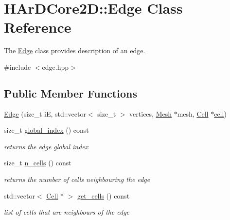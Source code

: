 \hypertarget{classHArDCore2D_1_1Edge}{}\section{H\+Ar\+D\+Core2D\+:\+:Edge Class Reference}
\label{classHArDCore2D_1_1Edge}


The \hyperlink{classHArDCore2D_1_1Edge}{Edge} class provides description of an edge.  




{\ttfamily \#include $<$edge.\+hpp$>$}

\subsection*{Public Member Functions}
\begin{DoxyCompactItemize}
\item 
\hyperlink{classHArDCore2D_1_1Edge_a1bca27244cfcd45e24e0b7485f148ddf}{Edge} (size\+\_\+t iE, std\+::vector$<$ size\+\_\+t $>$ vertices, \hyperlink{classHArDCore2D_1_1Mesh}{Mesh} $\ast$mesh, \hyperlink{classHArDCore2D_1_1Cell}{Cell} $\ast$\hyperlink{classHArDCore2D_1_1Edge_ad4be0bfb981ccf2c1e02e870772dbdc3}{cell})
\item 
size\+\_\+t \hyperlink{group__Mesh_ga774e975ebad5e6bdccf549215293d624}{global\+\_\+index} () const
\begin{DoxyCompactList}\small\item\em returns the edge global index \end{DoxyCompactList}\item 
size\+\_\+t \hyperlink{group__Mesh_ga0926b705b6169b73293e60e0c48e85f8}{n\+\_\+cells} () const
\begin{DoxyCompactList}\small\item\em returns the number of cells neighbouring the edge \end{DoxyCompactList}\item 
\mbox{\label{classHArDCore2D_1_1Edge_a72bedde2003c68d015c70326924b6d7f}} 
std\+::vector$<$ \hyperlink{classHArDCore2D_1_1Cell}{Cell} $\ast$ $>$ \hyperlink{classHArDCore2D_1_1Edge_a72bedde2003c68d015c70326924b6d7f}{get\+\_\+cells} () const
\begin{DoxyCompactList}\small\item\em list of cells that are neighbours of the edge \end{DoxyCompactList}\item 

\end{DoxyCompactItemize}
